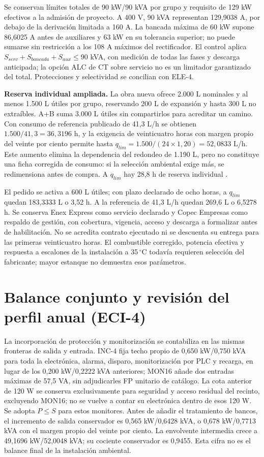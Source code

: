 Se conservan límites totales de 90 kW/90 kVA por grupo y requisito de 129 kW efectivos a la admisión de proyecto. A 400 V, 90 kVA representan 129,9038 A, por debajo de la derivación limitada a 160 A. La bancada máxima de 60 kW supone 86,6025 A antes de auxiliares y 63 kW en su tolerancia superior; no puede sumarse sin restricción a los 108 A máximos del rectificador. El control aplica $S_{serv}+S_{bancada}+S_{aux}\leq90$ kVA, con medición de todas las fases y descarga anticipada; la opción ALC de CT sobre servicio no es un limitador garantizado del total. Protecciones y selectividad se concilian con ELE-4.

\textbf{Reserva individual ampliada.} La obra nueva ofrece 2.000 L nominales y al menos 1.500 L útiles por grupo, reservando 200 L de expansión y hasta 300 L no extraíbles. A+B suma 3.000 L útiles sin compartirlos para acreditar un camino. Con consumo de referencia publicado de 41,3 L/h se obtienen $1.500/41,3=36,3196$ h, y la exigencia de veinticuatro horas con margen propio del veinte por ciento permite hasta $q_{lim}=1.500/(24\times1,20)=52,0833$ L/h. Este aumento elimina la dependencia del redondeo de 1.190 L, pero no constituye una ficha corregida de consumo: si la selección ambiental exige más, se redimensiona antes de compra. A $q_{lim}$ hay 28,8 h de reserva individual \parencite[pp.~1--3]{p7-fg-p200-ficha}.

El pedido se activa a 600 L útiles; con plazo declarado de ocho horas, a $q_{lim}$ quedan 183,3333 L o 3,52 h. A la referencia de 41,3 L/h quedan 269,6 L o 6,5278 h. Se conserva Enex Express como servicio declarado y Copec Empresas como respaldo de gestión, con cobertura, vigencia, acceso y descarga a formalizar antes de habilitación. No se acredita contrato ejecutado ni se descuenta su entrega para las primeras veinticuatro horas. El combustible corregido, potencia efectiva y respuesta a escalones de la instalación a 35\,$^{\circ}$C todavía requieren selección del fabricante; mayor estanque no demuestra esos parámetros.

\section{Balance conjunto y revisión del perfil anual (ECI-4)}
\label{sec:sd4-energia-eci4}

La incorporación de protección y monitorización se contabiliza en las mismas fronteras de salida y entrada. INC-4 fija techo propio de 0,650 kW/0,750 kVA para toda la electrónica, alarma, disparo, monitorización por PLC y recarga, en lugar de los 0,200 kW/0,2222 kVA anteriores; MON16 añade dos entradas máximas de 57,5 VA, sin adjudicarles FP unitario de catálogo. La cota anterior de 120 W se conserva exclusivamente para seguridad y acceso residual del recinto, excluyendo MON16; no se vuelve a contar su electrónica dentro de esos 120 W. Se adopta $P\leq S$ para estos monitores. Antes de añadir el tratamiento de bancos, el incremento de salida conservador es 0,565 kW/0,6428 kVA, o 0,678 kW/0,7713 kVA con el margen propio del veinte por ciento. La envolvente intermedia crece a 49,1696 kW/52,0048 kVA; su cociente conservador es 0,9455. Esta cifra no es el balance final de la instalación ambiental.

